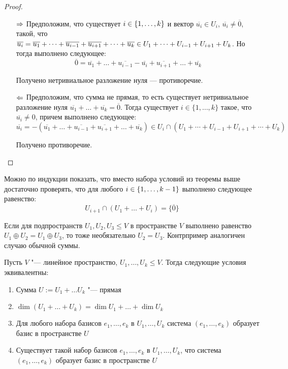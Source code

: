 \begin{proof}~
	\begin{itemize}
		\item[$\Rightarrow$] Предположим, что существует $i \in \{1, \dotsc, k\}$ и вектор $\overline{u_i} \in U_i$, $\overline{u_i} \ne \overline 0$, такой, что $\overline{u_i} = \overline{u_1} + \dots + \overline{u_{i-1}} + \overline{u_{i+1}} +\dots + \overline{u_k} \in U_1+\dots+U_{i-1}+U_{i+1}\hm{+}U_k$. Но тогда выполнено следующее:
		\[\overline{0} = \overline{u_1} + \dots + \overline{u_{i-1}} - \overline{u_i} + \overline{u_{i+1}} +\dots + \overline{u_k}\]
		
		Получено нетривиальное разложение нуля --- противоречие.
		
		\item[$\Leftarrow$] Предположим, что сумма не прямая, то есть существует нетривиальное разложение нуля $\overline{u_1} + \dots + \overline{u_k} = \overline{0}$. Тогда существует $i \in \{1, \dotsc, k\}$ такое, что $\overline{u_i} \ne 0$, причем выполнено следующее:
		\[\overline{u_i} = -(\overline{u_1} + \dots + \overline{u_{i-1}} + \overline{u_{i+1}} + \dots + \overline{u_k}) \in U_i \cap (U_1+\dotsb+U_{i-1}+U_{i+1}+\dotsb+ U_k)\]
		
		Получено противоречие.\qedhere
	\end{itemize}
\end{proof}

\begin{note}
	Можно по индукции показать, что вместо набора условий из теоремы выше достаточно проверять, что для любого $i \in \{1, \dotsc, k - 1\}$ выполнено следующее равенство:
	\[U_{i + 1} \cap (U_1 + \dots + U_{i}) = \{\overline{0}\}\]
\end{note}

\begin{note}
	Если для подпространств $U_1, U_2, U_3 \le V$ в пространстве $V$ выполнено равенство $U_1 \oplus U_2 = U_1 \oplus U_3$, то тоже необязательно $U_2 = U_3$. Контрпример аналогичен случаю обычной суммы.
\end{note}

\begin{theorem}
	Пусть $V$ "--- линейное пространство, $U_1, \dots, U_k \le V$. Тогда следующие условия эквивалентны:
	\begin{enumerate}
		\item Сумма $U := U_1 + \dots U_k$ "--- прямая
		\item $\dim{(U_1 + \dots + U_k)} = \dim{U_1} + \dots + \dim{U_k}$
		\item Для любого набора базисов $e_1, \dots, e_k$ в $U_1, \dots, U_k$ система $(e_1, \dots, e_k)$ образует базис в пространстве $U$
		\item Существует такой набор базисов $e_1, \dots, e_k$ в $U_1, \dots, U_k$, что система $(e_1, \dots, e_k)$ образует базис в пространстве $U$
	\end{enumerate}
\end{theorem}

